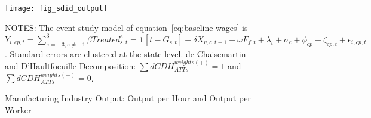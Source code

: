 \begin{figure}[H]
    \centering
    \texttt{[image: fig\_sdid\_output]}
    \caption{Manufacturing Industry Output: Output per Hour and Output per Worker}
    \label{fig:baseline-industry-output}
    \begin{minipage}{\columnwidth}
        \vspace{0.05in}
        \tiny NOTES: The event study model of equation~\ref{eq:baseline-wages} is $Y_{i,cp,t} = \sum_{{e = -3},{e \neq -1}}^{3} \beta Treated_{s,t}^e = \textbf{1}[t - G_{s,t}] + \delta X_{v,c,t-1} + \omega F_{f,t} + \lambda_{t} + \sigma_{c} + \phi_{cp} + \zeta_{cp,t} + \epsilon_{i,cp,t}$. Standard errors are clustered at the state level. de Chaisemartin and D'Haultfoeuille Decomposition: $\sum dCDH_{ATTs}^{weights(+)} = 1$ and $\sum dCDH_{ATTs}^{weights(-)} = 0$.
    \end{minipage}
\end{figure}